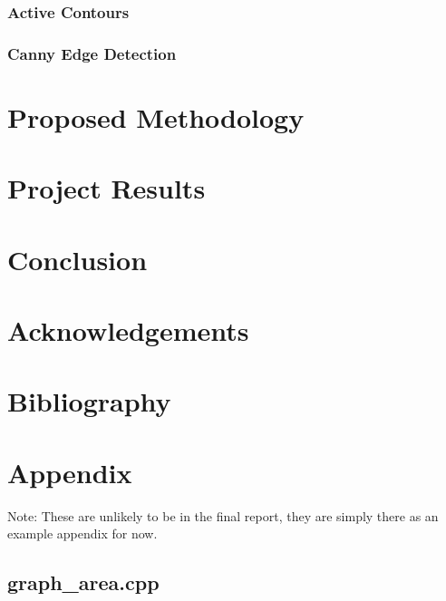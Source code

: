 \documentclass[12pt,english]{article}
\begin{document}
\subsubsection{Active Contours}

\subsubsection{Canny Edge Detection}

\section{Proposed Methodology}

\section{Project Results}

\section{Conclusion}

\section{Acknowledgements}

\pagebreak
\section{Bibliography}



\section{Appendix}
Note: These are unlikely to be in the final report, they are simply there as an example appendix for now.
\subsection*{graph\_area.cpp}
\label{code:grapharea}
\inputminted[breakanywhere=true, tabsize=4]{cpp}{../code/elliptic_fourier/graph_area.cpp}
\end{document}
